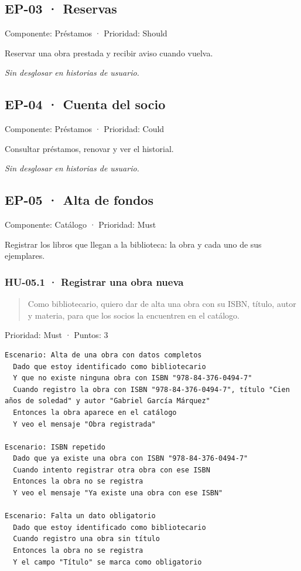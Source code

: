 \documentclass[11pt,a4paper]{article}
\begin{document}
\subsection*{EP-03 · Reservas}

Componente: Préstamos · Prioridad: Should

Reservar una obra prestada y recibir aviso cuando vuelva.

\emph{Sin desglosar en historias de usuario.}

\subsection*{EP-04 · Cuenta del socio}

Componente: Préstamos · Prioridad: Could

Consultar préstamos, renovar y ver el historial.

\emph{Sin desglosar en historias de usuario.}

\subsection*{EP-05 · Alta de fondos}

Componente: Catálogo · Prioridad: Must

Registrar los libros que llegan a la biblioteca: la obra y cada uno de sus ejemplares.

\subsubsection*{HU-05.1 · Registrar una obra nueva}

\begin{quote}
Como bibliotecario, quiero dar de alta una obra con su ISBN, título, autor y materia, para que los socios la encuentren en el catálogo.
\end{quote}

Prioridad: Must · Puntos: 3

\begin{Verbatim}[breaklines,fontsize=\small,frame=single,framerule=0.4pt,rulecolor=\color{black!25}]
Escenario: Alta de una obra con datos completos
  Dado que estoy identificado como bibliotecario
  Y que no existe ninguna obra con ISBN "978-84-376-0494-7"
  Cuando registro la obra con ISBN "978-84-376-0494-7", título "Cien años de soledad" y autor "Gabriel García Márquez"
  Entonces la obra aparece en el catálogo
  Y veo el mensaje "Obra registrada"

Escenario: ISBN repetido
  Dado que ya existe una obra con ISBN "978-84-376-0494-7"
  Cuando intento registrar otra obra con ese ISBN
  Entonces la obra no se registra
  Y veo el mensaje "Ya existe una obra con ese ISBN"

Escenario: Falta un dato obligatorio
  Dado que estoy identificado como bibliotecario
  Cuando registro una obra sin título
  Entonces la obra no se registra
  Y el campo "Título" se marca como obligatorio
\end{Verbatim}
\end{document}
